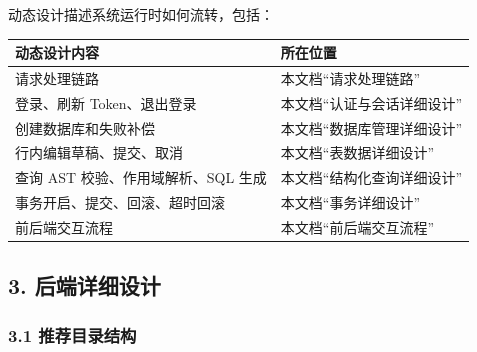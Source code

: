 \documentclass[
  a4paper,
  UTF8]{ctexart}
\begin{document}
动态设计描述系统运行时如何流转，包括：

\begin{longtable}[]{@{}ll@{}}
\toprule
动态设计内容 & 所在位置 \\
\midrule
\endhead
请求处理链路 & 本文档``请求处理链路'' \\
登录、刷新 Token、退出登录 & 本文档``认证与会话详细设计'' \\
创建数据库和失败补偿 & 本文档``数据库管理详细设计'' \\
行内编辑草稿、提交、取消 & 本文档``表数据详细设计'' \\
查询 AST 校验、作用域解析、SQL 生成 & 本文档``结构化查询详细设计'' \\
事务开启、提交、回滚、超时回滚 & 本文档``事务详细设计'' \\
前后端交互流程 & 本文档``前后端交互流程'' \\
\bottomrule
\end{longtable}

\hypertarget{ux540eux7aefux8be6ux7ec6ux8bbeux8ba1}{%
\subsection{3.
后端详细设计}\label{ux540eux7aefux8be6ux7ec6ux8bbeux8ba1}}

\hypertarget{ux63a8ux8350ux76eeux5f55ux7ed3ux6784}{%
\subsubsection{3.1
推荐目录结构}\label{ux63a8ux8350ux76eeux5f55ux7ed3ux6784}}
\end{document}

